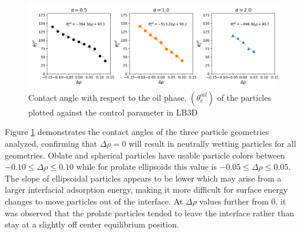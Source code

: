 \begin{figure}[h]
    \centering
    \includegraphics[scale = 0.5]{figures/model_validation/contact_angle_compare.png}
    \caption{Contact angle with respect to the oil phase, $(\theta_c^{oil})$ of the particles plotted against the 
    control parameter in LB3D}
    \label{fig:contact_angle_valid}
\end{figure}

Figure \ref{fig:contact_angle_valid} demonstrates the contact angles of the three particle geometries analyzed, 
confirming that $\Delta \rho = 0$ will result in neutrally wetting particles for all geometries. Oblate and spherical 
particles have usable particle colors between $-0.10 \leq \Delta \rho \leq 0.10$ while for prolate ellipsoids this 
value is $-0.05 \leq \Delta \rho \leq 0.05$. The slope of ellipsoidal particles appears to be lower which may arise 
from a larger interfacial adsorption energy, making it more difficult for surface energy changes to move particles out 
of the interface. At $\Delta \rho$ values further from 0, it was observed that the prolate particles tended to leave 
the interface rather than stay at a slightly off center equilibrium position. 